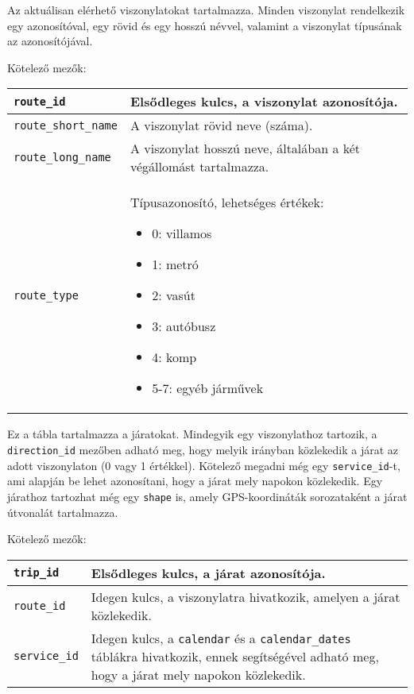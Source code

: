 
Az aktuálisan elérhető viszonylatokat tartalmazza. Minden viszonylat rendelkezik egy azonosítóval, egy rövid és egy hosszú névvel, valamint a viszonylat típusának az azonosítójával.

\medskip

\noindent Kötelező mezők:

\bigskip

\begin{tabular}{|p{3.5cm}|p{10cm}|}
\hline
\texttt{route\_id} & Elsődleges kulcs, a viszonylat azonosítója. \\
\hline
\texttt{route\_short\_name} & A viszonylat rövid neve (száma). \\
\hline
\texttt{route\_long\_name} & A viszonylat hosszú neve, általában a két végállomást tartalmazza. \\
\hline
\texttt{route\_type} & Típusazonosító, lehetséges értékek:
\begin{itemize}
\item 0: villamos
\item 1: metró
\item 2: vasút
\item 3: autóbusz
\item 4: komp
\item 5-7: egyéb járművek
\end{itemize}
\\
\hline
\end{tabular}


Ez a tábla tartalmazza a járatokat. Mindegyik egy viszonylathoz tartozik, a \texttt{direction\_id} mezőben adható meg, hogy melyik irányban közlekedik a járat az adott viszonylaton (0 vagy 1 értékkel). Kötelező megadni még egy \texttt{service\_id}-t, ami alapján be lehet azonosítani, hogy a járat mely napokon közlekedik. Egy járathoz tartozhat még egy \texttt{shape} is, amely GPS-koordináták sorozataként a járat útvonalát tartalmazza.

\medskip

\noindent Kötelező mezők:

\bigskip

\begin{tabular}{|p{3cm}|p{10cm}|}
\hline
\texttt{trip\_id} & Elsődleges kulcs, a járat azonosítója. \\
\hline
\texttt{route\_id} & Idegen kulcs, a viszonylatra hivatkozik, amelyen a járat közlekedik. \\
\hline
\texttt{service\_id} & Idegen kulcs, a \texttt{calendar} és a \texttt{calendar\_dates} táblákra hivatkozik, ennek segítségével adható meg, hogy a járat mely napokon közlekedik. \\
\hline
\end{tabular}

